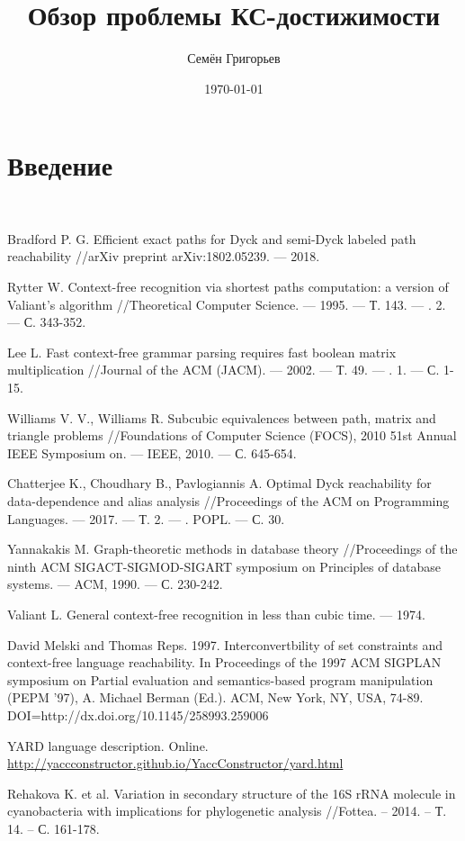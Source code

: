 \documentclass[12pt]{article}  %
\title{Обзор проблемы КС-достижимости}
\author{Семён Григорьев}
\date{\today}
\theoremstyle{remark}
\begin{document}

\maketitle 

\section{Введение}

~\cite{Bradford2018}

\begin{thebibliography}{9}

   Bradford P. G. Efficient exact paths for Dyck and semi-Dyck labeled path reachability //arXiv preprint arXiv:1802.05239. --- 2018.

   Rytter W. Context-free recognition via shortest paths computation: a version of Valiant's algorithm //Theoretical Computer Science. --- 1995. --- Т. 143. --- \textnumero. 2. --- С. 343-352.

   Lee L. Fast context-free grammar parsing requires fast boolean matrix multiplication //Journal of the ACM (JACM). --- 2002. --- Т. 49. --- \textnumero. 1. --- С. 1-15.

   Williams V. V., Williams R. Subcubic equivalences between path, matrix and triangle problems //Foundations of Computer Science (FOCS), 2010 51st Annual IEEE Symposium on. --- IEEE, 2010. --- С. 645-654.

   Chatterjee K., Choudhary B., Pavlogiannis A. Optimal Dyck reachability for data-dependence and alias analysis //Proceedings of the ACM on Programming Languages. --- 2017. --- Т. 2. --- \textnumero. POPL. --- С. 30.

   Yannakakis M. Graph-theoretic methods in database theory //Proceedings of the ninth ACM SIGACT-SIGMOD-SIGART symposium on Principles of database systems. --- ACM, 1990. --- С. 230-242.

   Valiant L. General context-free recognition in less than cubic time. --- 1974.

   David Melski and Thomas Reps. 1997. Interconvertbility of set constraints and context-free language reachability. 
   In Proceedings of the 1997 ACM SIGPLAN symposium on Partial evaluation and semantics-based program manipulation (PEPM '97), A. Michael Berman (Ed.). ACM, New York, NY, USA, 74-89. 
   DOI=http://dx.doi.org/10.1145/258993.259006

YARD language description. Online. \url{http://yaccconstructor.github.io/YaccConstructor/yard.html}

Rehakova K. et al. Variation in secondary structure of the 16S rRNA molecule in cyanobacteria with implications for phylogenetic analysis //Fottea. – 2014. – Т. 14. – С. 161-178.

\end{thebibliography}
\end{document}
